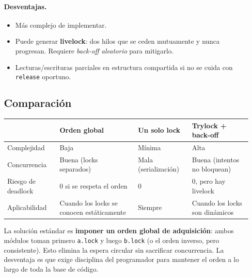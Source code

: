 \documentclass[11pt,a4paper]{article}
\begin{document}
\paragraph{Desventajas.}
\begin{itemize}[leftmargin=*,nosep]
    \item Más complejo de implementar.
    \item Puede generar \textbf{livelock}: dos hilos que se ceden
        mutuamente y nunca progresan. Requiere \emph{back-off
        aleatorio} para mitigarlo.
    \item Lecturas/escrituras parciales en estructura compartida
        si no se cuida con \texttt{release} oportuno.
\end{itemize}

\subsection*{Comparación}

\begin{center}
\small
\begin{tabular}{@{}lp{3.5cm}p{3.5cm}p{3.5cm}@{}}
\toprule
& \textbf{Orden global} & \textbf{Un solo lock} & \textbf{Trylock + back-off} \\
\midrule
Complejidad        & Baja                       & Mínima                 & Alta \\
Concurrencia       & Buena (locks separados)   & Mala (serialización)   & Buena (intentos no bloquean) \\
Riesgo de deadlock & 0 si se respeta el orden  & 0                      & 0, pero hay livelock \\
Aplicabilidad      & Cuando los locks se conocen estáticamente & Siempre & Cuando los locks son dinámicos \\
\bottomrule
\end{tabular}
\end{center}

\begin{respuesta}
La solución estándar es \textbf{imponer un orden global de
adquisición}: ambos módulos toman primero \texttt{a.lock} y luego
\texttt{b.lock} (o el orden inverso, pero consistente). Esto elimina
la espera circular sin sacrificar concurrencia. La desventaja es que
exige disciplina del programador para mantener el orden a lo largo
de toda la base de código.
\end{respuesta}

\end{document}
